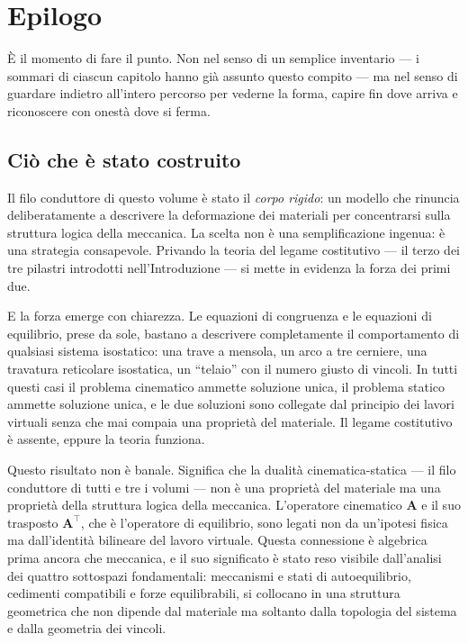\chapter*{Epilogo}

È il momento di fare il punto. Non nel senso di un semplice inventario — i sommari di ciascun capitolo hanno già assunto questo compito — ma nel senso di guardare indietro all'intero percorso per vederne la forma, capire fin dove arriva e riconoscere con onestà dove si ferma.


\section*{Ciò che è stato costruito}

Il filo conduttore di questo volume è stato il \textit{corpo rigido}: un modello che rinuncia deliberatamente a descrivere la deformazione dei materiali per concentrarsi sulla struttura logica della meccanica. La scelta non è una semplificazione ingenua: è una strategia consapevole. Privando la teoria del legame costitutivo --- il terzo dei tre pilastri introdotti nell'Introduzione --- si mette in evidenza la forza dei primi due.

E la forza emerge con chiarezza. Le equazioni di congruenza e le equazioni di equilibrio, prese da sole, bastano a descrivere completamente il comportamento di qualsiasi sistema isostatico: una trave a mensola, un arco a tre cerniere, una travatura reticolare isostatica, un ``telaio'' con il numero giusto di vincoli. In tutti questi casi il problema cinematico ammette soluzione unica, il problema statico ammette soluzione unica, e le due soluzioni sono collegate dal principio dei lavori virtuali senza che mai compaia una proprietà del materiale. Il legame costitutivo è assente, eppure la teoria funziona.

Questo risultato non è banale. Significa che la dualità cinematica-statica --- il filo conduttore di tutti e tre i volumi --- non è una proprietà del materiale ma una proprietà della struttura logica della meccanica. L'operatore cinematico $\bm{A}$ e il suo trasposto $\bm{A}^\top$, che è l'operatore di equilibrio, sono legati non da un'ipotesi fisica ma dall'identità bilineare del lavoro virtuale. Questa connessione è algebrica prima ancora che meccanica, e il suo significato è stato reso visibile dall'analisi dei quattro sottospazi fondamentali: meccanismi e stati di autoequilibrio, cedimenti compatibili e forze equilibrabili, si collocano in una struttura geometrica che non dipende dal materiale ma soltanto dalla topologia del sistema e dalla geometria dei vincoli.


